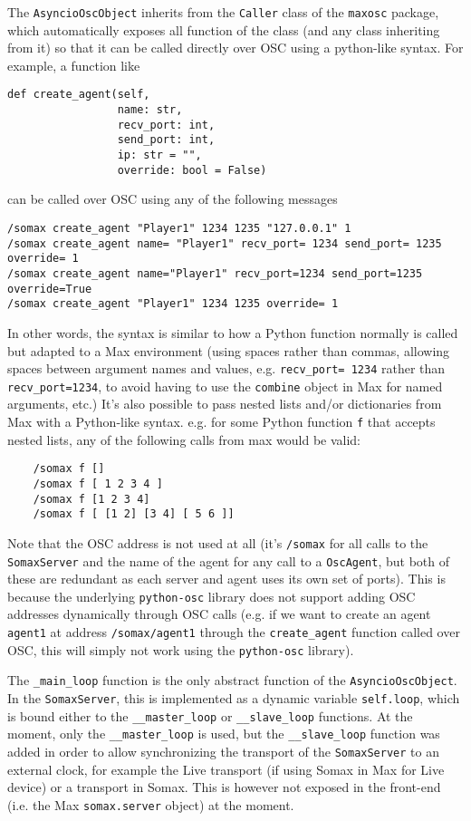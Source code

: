 The \texttt{AsyncioOscObject} inherits from the \texttt{Caller} class of the \texttt{maxosc} package, which automatically exposes all function of the class (and any class inheriting from it) so that it can be called directly over OSC using a python-like syntax. For example, a function like

\begin{lstlisting}
def create_agent(self, 
                 name: str,
                 recv_port: int, 
                 send_port: int,
                 ip: str = "",
                 override: bool = False)
\end{lstlisting}
can be called over OSC using any of the following messages

\begin{lstlisting}
/somax create_agent "Player1" 1234 1235 "127.0.0.1" 1
/somax create_agent name= "Player1" recv_port= 1234 send_port= 1235 override= 1
/somax create_agent name="Player1" recv_port=1234 send_port=1235 override=True
/somax create_agent "Player1" 1234 1235 override= 1
\end{lstlisting}
In other words, the syntax is similar to how a Python function normally is called but adapted to a Max environment (using spaces rather than commas, allowing spaces between argument names and values, e.g. \texttt{recv\_port= 1234} rather than \texttt{recv\_port=1234}, to avoid having to use the \texttt{combine} object in Max for named arguments, etc.) It's also possible to pass nested lists and/or dictionaries from Max with a Python-like syntax. e.g. for some Python function \texttt{f} that accepts nested lists, any of the following calls from max would be valid:

\begin{lstlisting}
	/somax f []
	/somax f [ 1 2 3 4 ]
	/somax f [1 2 3 4]
	/somax f [ [1 2] [3 4] [ 5 6 ]]
\end{lstlisting}
Note that the OSC address is not used at all (it's \texttt{/somax} for all calls to the \texttt{SomaxServer} and the name of the agent for any call to a \texttt{OscAgent}, but both of these are redundant as each server and agent uses its own set of ports). This is because the underlying \texttt{python-osc} library does not support adding OSC addresses dynamically through OSC calls (e.g. if we want to create an agent \texttt{agent1} at address \texttt{/somax/agent1} through the \texttt{create\_agent} function called over OSC, this will simply not work using the \texttt{python-osc} library).

The \texttt{\_main\_loop} function is the only abstract function of the \texttt{AsyncioOscObject}. In the \texttt{SomaxServer}, this is implemented as a dynamic variable \texttt{self.loop}, which is bound either to the \texttt{\_\_master\_loop} or \texttt{\_\_slave\_loop} functions. At the moment, only the \texttt{\_\_master\_loop} is used, but the \texttt{\_\_slave\_loop} function was added in order to allow synchronizing the transport of the \texttt{SomaxServer} to an external clock, for example the Live transport (if using Somax in Max for Live device) or a transport in Somax. This is however not exposed in the front-end (i.e. the Max \texttt{somax.server} object) at the moment.

